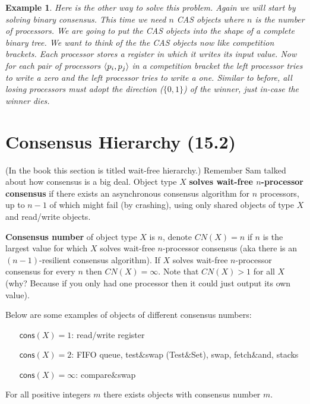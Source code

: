 \documentclass[twoside]{article}
\newtheorem{example}[theorem]{Example}
\newcommand\consF{\mathsf{cons}}
\DeclarePairedDelimiter\anglebrac{\langle}{\rangle}
\begin{document}
\begin{example}
Here is the other way to solve this problem. Again we will start by solving binary consensus. This time we need $n$ CAS objects where $n$ is the number of processors. We are going to put the CAS objects into the shape of a complete binary tree. We want to think of the the CAS objects now like competition brackets. Each processor stores a register in which it writes its input value. Now for each pair of processors $\anglebrac{p_i, p_j}$ in a competition bracket the left processor tries to write a zero and the left processor tries to write a one. Similar to before, all losing processors must adopt the direction ($\{0,1\}$) of the winner, just in-case the winner dies. 
\end{example}

\section{Consensus Hierarchy (15.2)}
(In the book this section is titled wait-free hierarchy.) Remember Sam talked about how consensus is a big deal. Object type $X$ \textbf{solves wait-free $n$-processor consensus} if there exists an asynchronous consensus algorithm for $n$ processors, up to $n-1$ of which might fail (by crashing), using only shared objects of type $X$ and read/write objects.

\textbf{Consensus number} of object type $X$ is $n$, denote $CN(X) = n$ if $n$ is the largest value for which $X$ solves wait-free $n$-processor consensus (aka there is an $(n-1)$-resilient consensus algorithm). If $X$ solves wait-free $n$-processor consensus for every $n$ then $CN(X) = \infty$. Note that $CN(X) > 1$ for all $X$ (why? Because if you only had one processor then it could just output its own value).

Below are some examples of objects of different consensus numbers:
\begin{enumerate}
\item[$\consF(X) = 1$:] read/write register
\item[$\consF(X) = 2$:] FIFO queue, test$\&$swap (Test$\&$Set), swap, fetch$\&$and, stacks 
\item[$\consF(X) = \infty$:] compare$\&$swap
\end{enumerate}
For all positive integers $m$ there exists objects with consensus number $m$.
\end{document}
